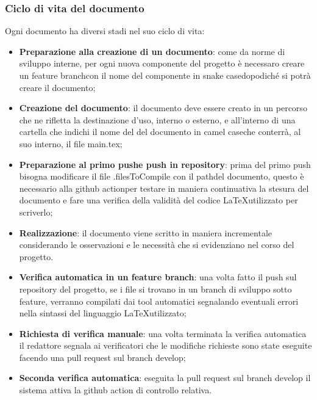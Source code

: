\subsubsection{Ciclo di vita del documento}
Ogni documento ha diversi stadi nel suo ciclo di vita:
\begin{itemize}
  \item \textbf{Preparazione alla creazione di un documento}: come da norme di
  sviluppo interne, per ogni nuova componente del progetto \`e necessaro creare un
  feature branch\glo con il nome del componente in snake case\glo dopodich\'e
  si potr\`a creare il documento;

  \item \textbf{Creazione del documento}: il documento deve essere creato in un
  percorso che ne rifletta la destinazione d'uso, interno o esterno, e
  all'interno di una cartella che indichi il nome del del documento in
  camel case\glo che conterr\`a, al suo interno, il file main.tex;

  \item \textbf{Preparazione al primo push\glo e push in repository\glo}: prima del primo
   push bisogna modificare il file .filesToCompile con il path\glo del documento,
   questo \`e necessario alla github action\glo per testare in maniera continuativa
   la stesura del documento e fare una verifica della validit\`a del codice
   \LaTeX \space utilizzato per scriverlo;

  \item \textbf{Realizzazione}: il documento viene scritto in maniera incrementale
  considerando le osservazioni e le necessit\`a che si evidenziano nel corso del
  progetto.

  \item \textbf{Verifica automatica in un feature branch}: una volta fatto il push
  sul repository del progetto, se i file si trovano in un branch di sviluppo
  sotto feature, verranno compilati dai tool automatici segnalando eventuali errori
  nella sintassi del linguaggio \LaTeX \space utilizzato;

  \item \textbf{Richiesta di verifica manuale}: una volta terminata la verifica
  automatica il redattore segnala ai verificatori che le modifiche richieste
  sono state eseguite facendo una pull request sul branch develop;

  \item \textbf{Seconda verifica automatica}: eseguita la pull request sul branch
  develop il sistema attiva la github action di controllo relativa.


\end{itemize}
